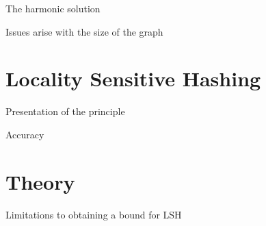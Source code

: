 \documentclass[11pt)]{beamer}
\begin{document}
\begin{frame}{The harmonic solution}
\end{frame}

\begin{frame}{Issues arise with the size of the graph}
\end{frame}

\section{Locality Sensitive Hashing}
\begin{frame}{Presentation of the principle}
\end{frame}

\begin{frame}{Accuracy}
\end{frame}

\section{Theory}
\begin{frame}{}
\end{frame}

\begin{frame}{Limitations to obtaining a bound for LSH}
\end{frame}
\end{document}
